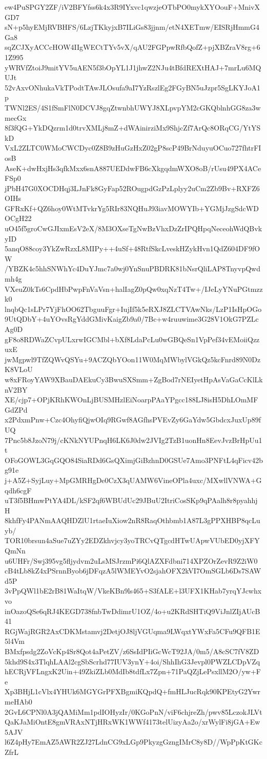 ew4PuSPGY2ZF/iV2BFYfss6k4x3R9IYxvc1qwzjeOTbPO0mykXYOouF+MnivXGD7
sN+p5hyEMjRVBHFS/6LzjTKkyjxB7ILiGs83jjnm/etN4XETmw/EISRjHmmG4Ga8
sqZCJXyACCcHOW4IIgWECtTYv5vX/qAU2FGPpwRfbQofZ+pjXBZraV8rg+61Z995
yWRVfZtoiJ9mitYV5uAEN5f3bOpYL1J1jhwZ2NJu4tBfdREXtHAJ+7mrLu6MQUJt
52vAxvONhukaVkTPodtTAwJLOsufa9aI7YzRszlEg2FGyBN5uJzpr5SgLKYJoA1p
TWNl2ES/4S1fSmFlN0DCVJ8gqZtwnbhUWYJ8XLpvpYM2cGKQblnhGG8za3wmecGx
8f3fQG+YkDQzrm1d0trvXMLj8mZ+dWAinirziMx9ShjcZf7ArQc8ORqCG/YtYSkD
VxL2ZLTC0WMoCWCDyc0Z8B9zHuGzHxZ02gP8scP49BrNduyuOCuo727fhtrFIosB
AseK+dwHxjHs3qfkMxx6snA887UEDdwFB6cXkgqdmWXO8oB/rUsu49PX4ACeFSp0
jPbH47G0XOCDHqj3LJnFk8GyFap52ROugpdGzPzLplyy2uCm2Zb9Bv+RXFZ6OIHs
GFRxKf+QZ6hoy0WtMTvkrYg5RIr83NQHuJ93iavMOWYIb+YGMjJzgSdcWDOCgH22
uO45f5groCwGJIxmEsV2eX/8M3OXseTgNwBzVhxDzZrIPQHpqNeceohWdQBvkyID
5anqO88coy3YkZwRzxL8MIPy++4uSf+48RtfSkcLveskHZykHvn1QdZ604DF9fOW
/YBZK4c5hhSNWhYc4DuYJmc7a0wj0YnSnuPBDRK81bNsrQliLAP8TnyvpQwdmh4g
VXeuZ0kTs6CpdHbPwpFnVaVsn+halIagZ0pQw0xqNzT4Tw+/IJeLyYNuPGtmzzk0
lnqbQc1sLPr7YjFhOO62TbguuFgr+IujIf5k5eRXJ8ZLCTVAwNks/LzP1IsHpOGo
9UtQDbY+4uYOvsRgYddGMivKaigZb9a0/7Bc+w4ruuwime3G28V1OkG7PZLcAg0D
gF8o8RDWaZCvpULxrwIGCMbl+bXf8LdaPcLu0wGBQeSn1VpPef34vEMoiiQzzuxE
jwMgpwl9TfZQWvQSYu+9ACZQbYOon11W0MqMWbylVGkQz5kcFnrd89N0DzK8VLoU
w8xFRoyYAW9XBauDAEkuCy3BwuSXSmm+ZgBod7rNEIyetHpAsVaGaCcKlLknV2BY
XE/cjp7+OPjKRhKWOnLjBUSMHzlEiNoarpPAaYPgcc188LJ8isH5DhLOmMFGdZPd
x2PdxmPnw+Czc4OhyfiQjwOIq9RGwf8AGfhsPVEvZy6GaYdw5GbdcxJuxUp89fUQ
7Pnc5b8JzoN79j/cKNkNYUPnqH6LK6J0dw2JVIg2TzB1uonHn8EevJvzBrHpUu1t
OFoGOWL3GqGQO84SiaRDd6GsQXimjGiBzhnD0GSUe7Amo3PNFtL4qFicv42bg91e
j+A5Z+SyjLuy+MpGMRHgDe0CzX3qUAMW6VineOPla4uxc/MXwllVNWA+Gqdh6cgF
uT3f5BHmwPtYA4DL/kSF2qf6WBUdUc29JBuU2ItriCosSKp9qPAalh8r8pyahhjH
8khfFy4PANmAAQHDZlU1rtaeIuXiow2nR8RaqOthbmb1A87L3gPPXHBP8qcLuyb/
TOR10brsun4aSue7uZYy2EDZkhvjcy3yoTRCvQTgcdHTwUApwVUbED0yjXFYQmNn
u6UHFr/Swj395vg5fljydvm2uLsMSJrzmPi6QlAZXFdbni714XPZOrZevR9Z2iW0
cB4tLb8kZ4xPSrnnByob6jDFqzA5lWMEYvO2sjahOFX2kVI7OmSGLb6Ds7SAWd5P
3vPpQWl1bE2rB81WaItqW/VkeKBn9ls465+S3fALE+l3UFX1KHab7yrqYJcwhxvo
inOazoQSe6qRJ4KEGD738fnbTwDdimrU1OZ/4o+u2KRdSHTiQ9ViJnlZIjAUcB41
RGjWajRGR2AxCDKMstamvj2DetjOJ8ljVGUqma9LWqxtYWxFa5CFu9QFB1E5l4Vm
BMxfpsdg2ZoVcKp4Sr8Qot4aPetZV/z6SsIdPIiGcWcT92JA/0m5/A8cSC7fV8ZD
5khd9S4x3TlqhLAAl2cgSbScrhd77IUV3ynY+4oi/ShhIhG3Jevpl0PWZLCDpVZq
hECRjVFLngxK2Uin+49ZkiZLb0MdIb8tdfLx7Zpn+71PaQZjLePsxllM2O/yw+Fe
Xp3BHjL1cVlx4YHUk6MGYGrPFXBgmiKQpdQ+fmHLJucRqk90KPEtyG2YwrmeHAb0
2GvL6CPNl0A3jQAMiMm1pdIOHyzIr/0KGoPnN/viF6chjreZh/pwv85LczokJLVt
QaKJaMiOntE8gmVRAxNTjHRxWK1WWf4173telUizyAa2o/xrWylFi8jGA+Ew5AJV
l6Z4pHy7EmAZ5AWR2ZJ27LdnCG9xLGp9PkyzgGzngIMrC8y8D//WpPpKtGKcZfrL
